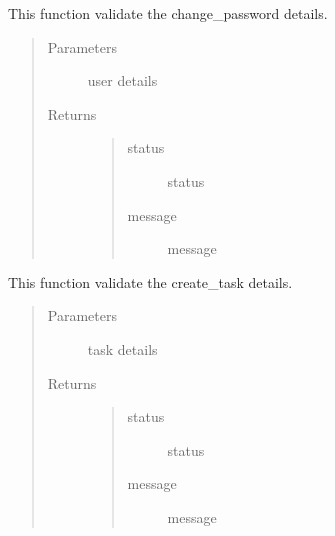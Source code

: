 \documentclass[letterpaper,10pt,english]{sphinxmanual}
\begin{document}
\begin{fulllineitems}
\label{\detokenize{janta:janta.viewhelper.validate_change_password}}
This function validate the change\_password details.
\begin{quote}\begin{description}
\item[{Parameters}] \leavevmode
{} \textendash{} user details

\item[{Returns}] \leavevmode
\begin{quote}\begin{description}
\item[{status}] \leavevmode
status

\item[{message}] \leavevmode
message

\end{description}\end{quote}


\end{description}\end{quote}

\end{fulllineitems}


\begin{fulllineitems}
\label{\detokenize{janta:janta.viewhelper.validate_create_task}}
This function validate the create\_task details.
\begin{quote}\begin{description}
\item[{Parameters}] \leavevmode
{} \textendash{} task details

\item[{Returns}] \leavevmode
\begin{quote}\begin{description}
\item[{status}] \leavevmode
status

\item[{message}] \leavevmode
message

\end{description}\end{quote}


\end{description}\end{quote}

\end{fulllineitems}
\end{document}

